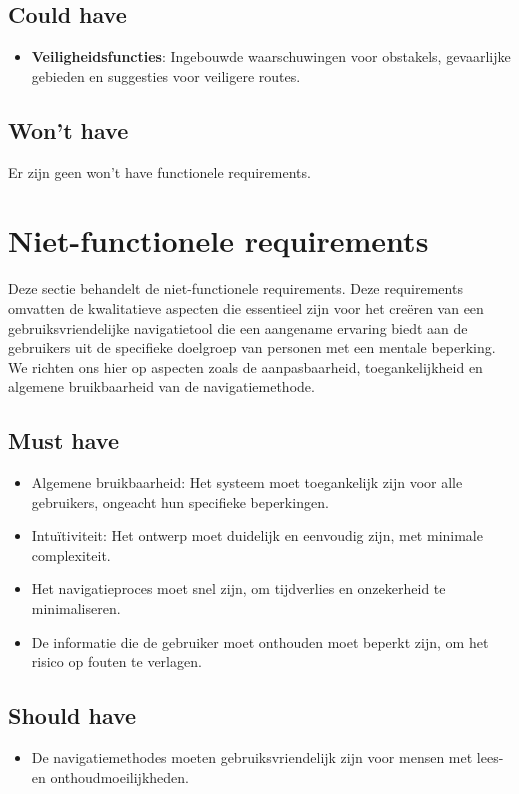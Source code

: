 \subsection*{Could have}
\begin{itemize}
    \item \textbf{Veiligheidsfuncties}: Ingebouwde waarschuwingen voor obstakels, gevaarlijke gebieden en suggesties voor veiligere routes.
\end{itemize}

\subsection*{Won't have}
Er zijn geen won't have functionele requirements.


\section{Niet-functionele requirements}
\label{sec:niet-functionele-requirements}

Deze sectie behandelt de niet-functionele requirements. Deze requirements omvatten de kwalitatieve aspecten die essentieel zijn voor het creëren van een gebruiksvriendelijke navigatietool die een aangename ervaring biedt aan de gebruikers uit de specifieke doelgroep van personen met een mentale beperking. We richten ons hier op aspecten zoals de aanpasbaarheid, toegankelijkheid en algemene bruikbaarheid van de navigatiemethode.

\subsection*{Must have}
\begin{itemize}
    \item {Algemene bruikbaarheid}: Het systeem moet toegankelijk zijn voor alle gebruikers, ongeacht hun specifieke beperkingen.
    \item {Intuïtiviteit}: Het ontwerp moet duidelijk en eenvoudig zijn, met minimale complexiteit.
    \item Het navigatieproces moet snel zijn, om tijdverlies en onzekerheid te minimaliseren.
    \item De informatie die de gebruiker moet onthouden moet beperkt zijn, om het risico op fouten te verlagen.
\end{itemize}

\subsection*{Should have}
\begin{itemize}
    \item De navigatiemethodes moeten gebruiksvriendelijk zijn voor mensen met lees- en onthoudmoeilijkheden.
\end{itemize}

